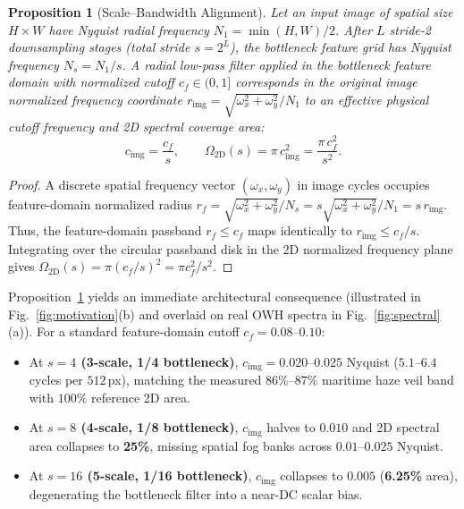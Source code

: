 \documentclass[journal,twoside]{IEEEtran}
\newtheorem{proposition}{Proposition}
\begin{document}
\begin{proposition}[Scale--Bandwidth Alignment]
\label{prop:scale}
Let an input image of spatial size $H\times W$ have Nyquist radial frequency $N_1 = \min(H,W)/2$. After $L$ stride-2 downsampling stages (total stride $s=2^L$), the bottleneck feature grid has Nyquist frequency $N_s = N_1/s$. A radial low-pass filter applied in the bottleneck feature domain with normalized cutoff $c_f \in (0,1]$ corresponds in the original image normalized frequency coordinate $r_{\mathrm{img}} = \sqrt{\omega_x^2 + \omega_y^2}/N_1$ to an effective physical cutoff frequency and 2D spectral coverage area:
\begin{equation}
c_{\mathrm{img}} = \frac{c_f}{s}, \qquad \Omega_{\mathrm{2D}}(s) = \pi\,c_{\mathrm{img}}^2 = \frac{\pi\,c_f^2}{s^2}.
\label{eq:scale_bw}
\end{equation}
\end{proposition}

\begin{proof}
A discrete spatial frequency vector $(\omega_x,\omega_y)$ in image cycles occupies feature-domain normalized radius $r_f = \sqrt{\omega_x^2+\omega_y^2}/N_s = s\sqrt{\omega_x^2+\omega_y^2}/N_1 = s\,r_{\mathrm{img}}$. Thus, the feature-domain passband $r_f \le c_f$ maps identically to $r_{\mathrm{img}} \le c_f/s$. Integrating over the circular passband disk in the 2D normalized frequency plane gives $\Omega_{\mathrm{2D}}(s) = \pi(c_f/s)^2 = \pi c_f^2 / s^2$.
\end{proof}

Proposition~\ref{prop:scale} yields an immediate architectural consequence (illustrated in Fig.~\ref{fig:motivation}(b) and overlaid on real OWH spectra in Fig.~\ref{fig:spectral}(a)). For a standard feature-domain cutoff $c_f = 0.08\text{--}0.10$:
\begin{itemize}
    \item At \textbf{$s=4$ (3-scale, 1/4 bottleneck)}, $c_{\mathrm{img}} = 0.020\text{--}0.025$ Nyquist ($5.1\text{--}6.4$ cycles per $512$\,px), matching the measured $86\%\text{--}87\%$ maritime haze veil band with $100\%$ reference 2D area.
    \item At \textbf{$s=8$ (4-scale, 1/8 bottleneck)}, $c_{\mathrm{img}}$ halves to $0.010$ and 2D spectral area collapses to \textbf{25\%}, missing spatial fog banks across $0.01\text{--}0.025$ Nyquist.
    \item At \textbf{$s=16$ (5-scale, 1/16 bottleneck)}, $c_{\mathrm{img}}$ collapses to $0.005$ (\textbf{6.25\%} area), degenerating the bottleneck filter into a near-DC scalar bias.
\end{itemize}
\end{document}
